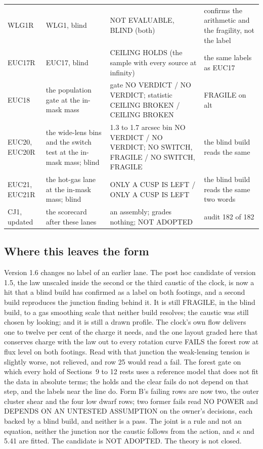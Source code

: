 \documentclass[10pt]{article}
\begin{document}
{\begin{longtable}{@{}p{1.6cm}p{3.8cm}p{5.6cm}p{4.7cm}@{}}
WLG1R & WLG1, blind & NOT EVALUABLE, BLIND (both) & confirms the arithmetic and the fragility, not the label\\
EUC17R & EUC17, blind & CEILING HOLDS (the sample with every source at infinity) & the same labels as EUC17\\
EUC18 & the population gate at the in-mask mass & gate NO VERDICT / NO VERDICT; statistic CEILING BROKEN / CEILING BROKEN & FRAGILE on alt\\
EUC20, EUC20R & the wide-lens bins and the switch test at the in-mask mass; blind & 1.3 to 1.7 arcsec bin NO VERDICT / NO VERDICT; NO SWITCH, FRAGILE / NO SWITCH, FRAGILE & the blind build reads the same\\
EUC21, EUC21R & the hot-gas lane at the in-mask mass; blind & ONLY A CUSP IS LEFT / ONLY A CUSP IS LEFT & the blind build reads the same two words\\
CJ1, updated & the scorecard after these lanes & an assembly; grades nothing; NOT ADOPTED & audit 182 of 182\\\bottomrule
\end{longtable}}

\subsection{Where this leaves the form}
Version 1.6 changes no label of an earlier lane. The post hoc candidate of version 1.5, the law unscaled inside the second or the third caustic of the clock, is now a hit that a blind build has confirmed as a label on both footings, and a second build reproduces the junction finding behind it. It is still FRAGILE, in the blind build, to a gas smoothing scale that neither build resolves; the caustic was still chosen by looking; and it is still a drawn profile. The clock's own flow delivers one to twelve per cent of the charge it needs, and the one layout graded here that conserves charge with the law out to every rotation curve FAILS the forest row at flux level on both footings. Read with that junction the weak-lensing tension is slightly worse, not relieved, and row 25 would read a fail. The forest gate on which every hold of Sections~9 to 12 rests uses a reference model that does not fit the data in absolute terms; the holds and the clear fails do not depend on that step, and the labels near the line do. Form B's failing rows are now two, the outer cluster shear and the four low dwarf rows; two former fails read NO POWER and DEPENDS ON AN UNTESTED ASSUMPTION on the owner's decisions, each backed by a blind build, and neither is a pass. The joint is a rule and not an equation, neither the junction nor the caustic follows from the action, and $\kappa$ and 5.41 are fitted. The candidate is NOT ADOPTED. The theory is not closed.
\end{document}
